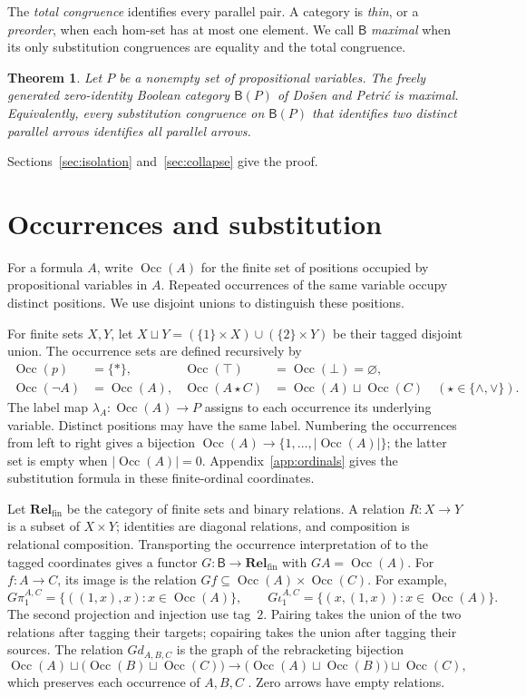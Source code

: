 \documentclass[11pt]{article}
\newtheorem{theorem}{Theorem}[section]
\newcommand{\B}{\mathsf B}
\newcommand{\Occ}{\operatorname{Occ}}
\newcommand{\Rel}{\mathbf{Rel}_{\mathrm{fin}}}
\begin{document}
The \emph{total congruence} identifies every parallel pair. A category
is \emph{thin}, or a \emph{preorder}, when each hom-set has at most one
element. We call $\B$ \emph{maximal} when its only substitution
congruences are equality and the total congruence.

\begin{theorem}\label{thm:main}
Let $P$ be a nonempty set of propositional variables. The freely
generated zero-identity Boolean category $\B(P)$ of Do\v{s}en and
Petri\'c is maximal. Equivalently, every substitution congruence on
$\B(P)$ that identifies two distinct parallel arrows identifies all
parallel arrows.
\end{theorem}

Sections~\ref{sec:isolation} and~\ref{sec:collapse} give the proof.

\section{Occurrences and substitution}\label{sec:occurrences}

For a formula $A$, write $\Occ(A)$ for the finite set of positions
occupied by propositional variables in $A$. Repeated occurrences of the
same variable occupy distinct positions. We use disjoint unions to
distinguish these positions.

For finite sets $X,Y$, let
$X\sqcup Y=(\{1\}\times X)\cup(\{2\}\times Y)$ be their tagged
disjoint union. The occurrence sets are defined recursively by
\[
 \begin{aligned}
 \Occ(p)&=\{*\},&
 \Occ(\top)&=\Occ(\bot)=\varnothing,\\
 \Occ(\neg A)&=\Occ(A),&
 \Occ(A\mathbin\star C)&=\Occ(A)\sqcup\Occ(C)
       \quad(\star\in\{\wedge,\vee\}).
 \end{aligned}
\]
The label map $\lambda_A:\Occ(A)\to P$ assigns to each occurrence
its underlying variable. Distinct positions may have the same label.
Numbering the occurrences from left to right gives a bijection
$\Occ(A)\to\{1,\ldots,|\Occ(A)|\}$; the latter set is empty when
$|\Occ(A)|=0$. Appendix~\ref{app:ordinals} gives the substitution
formula in these finite-ordinal coordinates.

Let $\Rel$ be the category of finite sets and binary relations.
A relation $R:X\to Y$ is a subset of $X\times Y$; identities are
diagonal relations, and composition is relational composition.
Transporting the occurrence interpretation of \cite{DP} to the
tagged coordinates gives a functor
$G:\B\to\Rel$ with $GA=\Occ(A)$. For $f:A\to C$, its image is
the relation $Gf\subseteq\Occ(A)\times\Occ(C)$.
For example,
\[
 G\pi_1^{A,C}=\{((1,x),x):x\in\Occ(A)\},\qquad
 G\iota_1^{A,C}=\{(x,(1,x)):x\in\Occ(A)\}.
\]
The second projection and injection use tag~$2$. Pairing takes the
union of the two relations after tagging their targets; copairing
takes the union after tagging their sources. The relation $Gd_{A,B,C}$
is the graph of the rebracketing bijection
\[
 \Occ(A)\sqcup\bigl(\Occ(B)\sqcup\Occ(C)\bigr)
 \longrightarrow
 \bigl(\Occ(A)\sqcup\Occ(B)\bigr)\sqcup\Occ(C),
\]
which preserves each occurrence of $A,B,C$
\cite[\S2.9, p.~60]{DP}. Zero arrows have empty relations.
\end{document}
